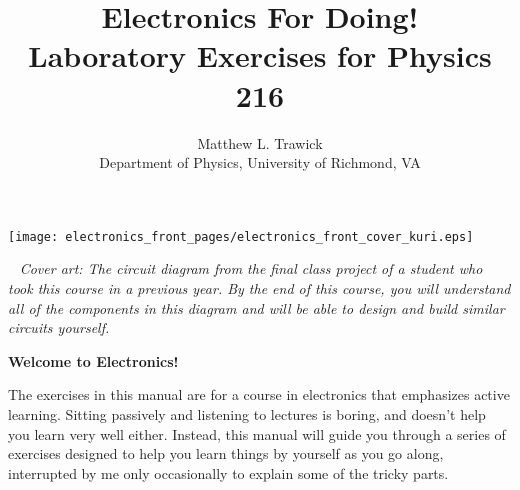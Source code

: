 \thispagestyle{empty}

\begin{center}
\texttt{[image: electronics\_front\_pages/electronics\_front\_cover\_kuri.eps]}
\end{center}
\newpage

\restoregeometry
\restorepagecolor
\thispagestyle{empty}

\
\vfill
\textit{Cover art: The circuit diagram from the final class project of a student who took this course in a previous year.  By the end of this course, you will understand all of the components in this diagram and will be able to design and build similar circuits  yourself.}
\pagebreak



\title{Electronics For Doing!\\
Laboratory Exercises for Physics 216}

\author{Matthew L. Trawick\\[4pt]
Department of Physics, University of Richmond, VA \\[4pt]
}

\maketitle

\vspace{0.4 in}


\begin{center}
\large{\textbf{Welcome to Electronics!}}
\end{center}

The exercises in this manual are for a course in electronics that emphasizes active learning. 
Sitting passively and listening to lectures is boring, and doesn't help you learn very well either.
Instead, this manual will guide you through a series of exercises designed to help you learn things by yourself as you go along, interrupted by me only occasionally to explain some of the tricky parts.

